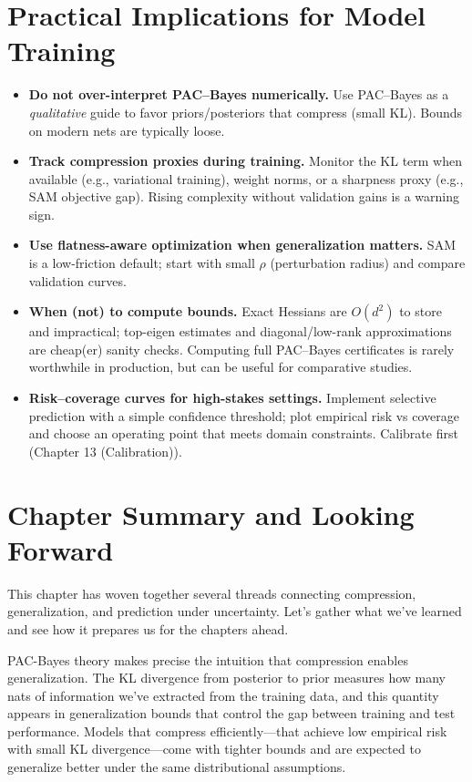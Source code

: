 \section{Practical Implications for Model Training}

\begin{itemize}
\item \textbf{Do not over-interpret PAC--Bayes numerically.} Use PAC--Bayes as a \emph{qualitative} guide to favor priors/posteriors that compress (small KL). Bounds on modern nets are typically loose.
\item \textbf{Track compression proxies during training.} Monitor the KL term when available (e.g., variational training), weight norms, or a sharpness proxy (e.g., SAM objective gap). Rising complexity without validation gains is a warning sign.
\item \textbf{Use flatness-aware optimization when generalization matters.} SAM is a low-friction default; start with small $\rho$ (perturbation radius) and compare validation curves.
\item \textbf{When (not) to compute bounds.} Exact Hessians are $O(d^2)$ to store and impractical; top-eigen estimates and diagonal/low-rank approximations are cheap(er) sanity checks. Computing full PAC--Bayes certificates is rarely worthwhile in production, but can be useful for comparative studies.
\item \textbf{Risk--coverage curves for high-stakes settings.} Implement selective prediction with a simple confidence threshold; plot empirical risk vs coverage and choose an operating point that meets domain constraints. Calibrate first (Chapter 13 (Calibration)).
\end{itemize}

\vspace{1.2em}
\section{Chapter Summary and Looking Forward}

This chapter has woven together several threads connecting compression, generalization, and prediction under uncertainty. Let's gather what we've learned and see how it prepares us for the chapters ahead.

\vspace{0.3cm}

PAC-Bayes theory makes precise the intuition that compression enables generalization. The KL divergence from posterior to prior measures how many nats of information we've extracted from the training data, and this quantity appears in generalization bounds that control the gap between training and test performance. Models that compress efficiently---that achieve low empirical risk with small KL divergence---come with tighter bounds and are expected to generalize better under the same distributional assumptions.

